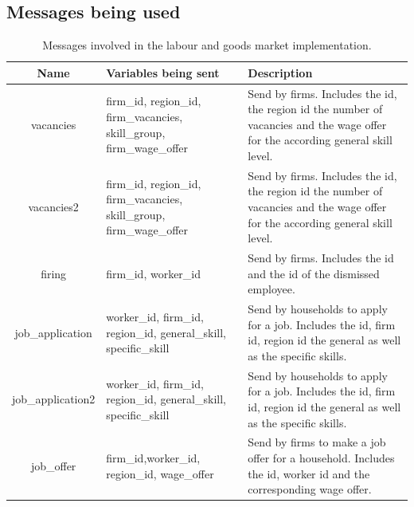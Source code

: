 \subsection{Messages being used}



\begin{table}[!htb]\caption{Messages involved in the labour and goods market implementation.}
\begin{center}
\begin{tabular}{|c|l|l|}
\hline
Name & Variables being sent & Description \\
\hline

vacancies & {\parbox[l]{5cm}{firm\_id, region\_id, firm\_vacancies,
skill\_group, firm\_wage\_offer}}& {\parbox[l]{5cm}{Send by firms.
Includes the id, the region id the number of vacancies and the
wage offer for the according general skill level.}} \\

\hline

vacancies2 & {\parbox[l]{5cm}{firm\_id, region\_id, firm\_vacancies,
skill\_group, firm\_wage\_offer}}& {\parbox[l]{5cm}{Send by firms.
Includes the id, the region id the number of vacancies and the
wage offer for the according general skill level.}} \\
\hline

firing & {\parbox[l]{5cm}{firm\_id, worker\_id}}
& {\parbox[l]{5cm}{Send by firms. Includes the id and the id of the dismissed employee.}}  \\

\hline

job\_application & {\parbox[l]{5cm}{worker\_id, firm\_id,
region\_id, general\_skill, specific\_skill}} &
{\parbox[l]{5cm}{Send by households to apply for a job. Includes the
id, firm id, region id the general
as well as the specific skills.}}   \\
\hline


job\_application2 & {\parbox[l]{5cm}{worker\_id, firm\_id,
region\_id, general\_skill, specific\_skill}} &
{\parbox[l]{5cm}{Send by households to apply for a job. Includes the
id, firm id, region id the general
as well as the specific skills.}}   \\
\hline


job\_offer & {\parbox[l]{5cm}{ firm\_id,worker\_id, region\_id,
wage\_offer}} & {\parbox[l]{5cm}{Send by firms to make a job offer
for a household. Includes the id, worker id and the
corresponding wage offer.}}   \\


\end{tabular}
\end{center}
\end{table}
